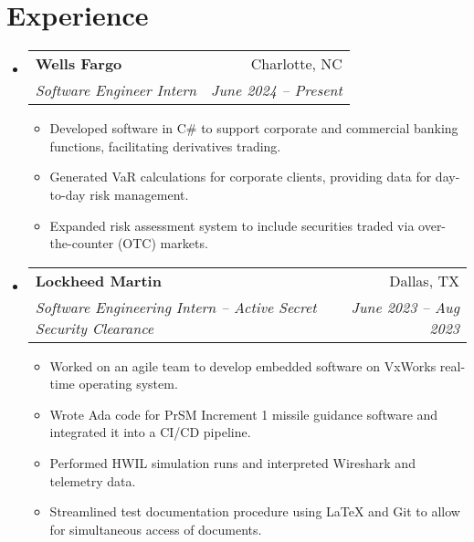 \documentclass[letterpaper,11pt]{article}
\makeatletter
\newcommand{\resumeItemExperience}[1]{
  \item\small{
    {#1 \vspace{-2pt}}
  }
}
\newcommand{\resumeSubheading}[4]{
  \vspace{-1pt}\item
    \begin{tabular*}{0.97\textwidth}{l@{\extracolsep{\fill}}r}
      \textbf{#1} & #2 \\
      \textit{\small#3} & \textit{\small #4} \\
    \end{tabular*}\vspace{-6pt}
}
\newcommand{\resumeSubHeadingListStart}{\begin{itemize}[leftmargin=*, label={}]}
\newcommand{\resumeSubHeadingListEnd}{\end{itemize}}
\newcommand{\resumeItemListStart}{\begin{itemize}}
\newcommand{\resumeItemListEnd}{\end{itemize}\vspace{-5pt}}
\makeatother
\begin{document}
\section{Experience}
  \resumeSubHeadingListStart
    \resumeSubheading
      {Wells Fargo}{Charlotte, NC}
      {Software Engineer Intern}{June 2024 -- Present}
      \resumeItemListStart
        \resumeItemExperience
          {Developed software in C\# to support corporate and commercial banking functions, facilitating derivatives trading.}
        \resumeItemExperience
          {Generated VaR calculations for corporate clients, providing data for day-to-day risk management.}
        \resumeItemExperience
          {Expanded risk assessment system to include securities traded via over-the-counter (OTC) markets.}
        \resumeItemListEnd
    \resumeSubheading
      {Lockheed Martin}{Dallas, TX}
      {Software Engineering Intern -- Active Secret Security Clearance}{June 2023 -- Aug 2023}
      \resumeItemListStart
        \resumeItemExperience
          {Worked on an agile team to develop embedded software on VxWorks real-time operating system.}
        \resumeItemExperience
          {Wrote Ada code for PrSM Increment 1 missile guidance software and integrated it into a CI/CD pipeline.}
        \resumeItemExperience
          {Performed HWIL simulation runs and interpreted Wireshark and telemetry data.}
        \resumeItemExperience
          {Streamlined test documentation procedure using LaTeX and Git to allow for simultaneous access of documents.}
        \resumeItemListEnd
  \resumeSubHeadingListEnd

\end{document}
